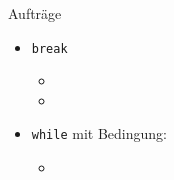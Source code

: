 \begin{frame}[fragile]{Aufträge}
    \begin{itemize}
        \item \lstinline|break|
        \begin{itemize}
             \item {}
            \item {}
        \end{itemize}
        \item \lstinline|while| mit Bedingung:
        \begin{itemize}
             \item {}
        \end{itemize}
    \end{itemize}
\end{frame}
